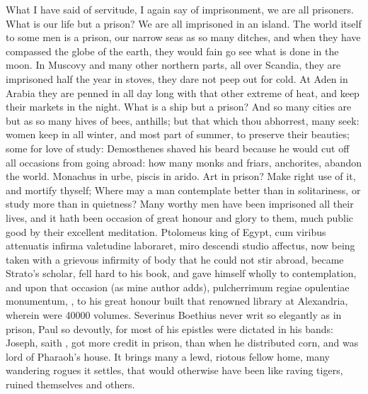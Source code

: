 {What I have said of servitude, I again say of imprisonment, we are all
prisoners. What is our life but a prison? We are all imprisoned
in an island. The world itself to some men is a prison, our narrow seas
as so many ditches, and when they have compassed the globe of the
earth, they would fain go see what is done in the moon. In
Muscovy and many other northern parts, all over Scandia, they are
imprisoned half the year in stoves, they dare not peep out for cold. At
Aden in Arabia they are penned in all day long with that other
extreme of heat, and keep their markets in the night. What is a ship
but a prison? And so many cities are but as so many hives of bees,
anthills; but that which thou abhorrest, many seek: women keep in all
winter, and most part of summer, to preserve their beauties; some for
love of study: Demosthenes shaved his beard because he would cut off
all occasions from going abroad: how many monks and friars, anchorites,
abandon the world. Monachus in urbe, piscis in arido. Art in prison?
Make right use of it, and mortify thyself;  Where may a man
contemplate better than in solitariness, or study more than in
quietness? Many worthy men have been imprisoned all their lives, and it
hath been occasion of great honour and glory to them, much public good
by their excellent meditation. Ptolomeus king of Egypt, cum
viribus attenuatis infirma valetudine laboraret, miro descendi studio
affectus, \etc{} now being taken with a grievous infirmity of body that he
could not stir abroad, became Strato's scholar, fell hard to his book,
and gave himself wholly to contemplation, and upon that occasion (as
mine author adds), pulcherrimum regiae opulentiae monumentum, \etc{}, to
his great honour built that renowned library at Alexandria, wherein
were 40\thinspace{}000 volumes. Severinus Boethius never writ so elegantly as in
prison, Paul so devoutly, for most of his epistles were dictated in his
bands: Joseph, saith \Austin{}, got more credit in prison, than when
he distributed corn, and was lord of Pharaoh's house. It brings many a
lewd, riotous fellow home, many wandering rogues it settles, that would
otherwise have been like raving tigers, ruined themselves and others.

}
